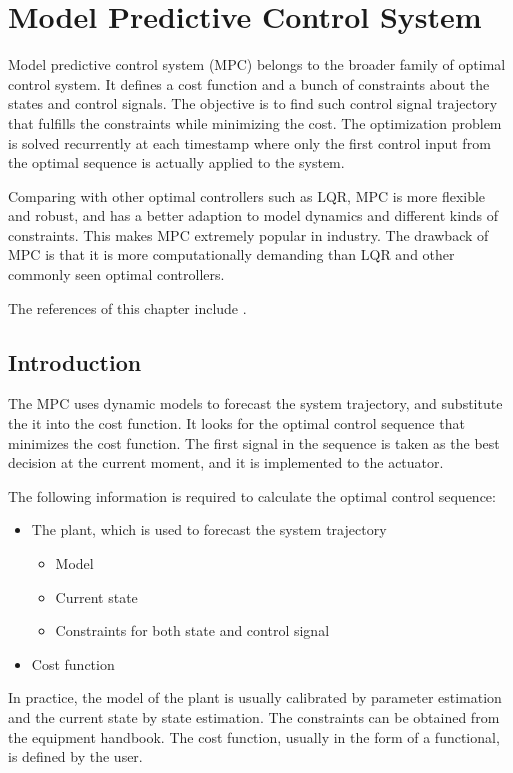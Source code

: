 \chapter{Model Predictive Control System} \label{ch:mpcs}

Model predictive control system (MPC) belongs to the broader family of optimal control system. It defines a cost function and a bunch of constraints about the states and control signals. The objective is to find such control signal trajectory that fulfills the constraints while minimizing the cost. The optimization problem is solved recurrently at each timestamp where only the first control input from the optimal sequence is actually applied to the system. 

Comparing with other optimal controllers such as LQR, MPC is more flexible and robust, and has a better adaption to model dynamics and different kinds of constraints. This makes MPC extremely popular in industry. The drawback of MPC is that it is more computationally demanding than LQR and other commonly seen optimal controllers.

The references of this chapter include \cite{rawlings2017model}.

\section{Introduction}

The MPC uses dynamic models to forecast the system trajectory, and substitute the it into the cost function. It looks for the optimal control sequence that minimizes the cost function. The first signal in the sequence is taken as the best decision at the current moment, and it is implemented to the actuator.

The following information is required to calculate the optimal control sequence:
\begin{itemize}
	\item The plant, which is used to forecast the system trajectory
	\begin{itemize}
		\item Model
		\item Current state
		\item Constraints for both state and control signal
	\end{itemize}
	\item Cost function
\end{itemize}
In practice, the model of the plant is usually calibrated by parameter estimation and the current state by state estimation. The constraints can be obtained from the equipment handbook. The cost function, usually in the form of a functional, is defined by the user.

